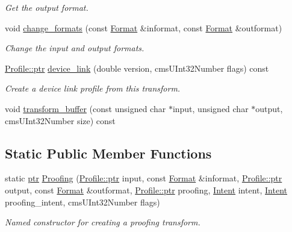 \begin{DoxyCompactItemize}
\begin{DoxyCompactList}\small\item\em Get the output format. \end{DoxyCompactList}\item 
void \hyperlink{class_c_m_s_1_1_transform_a1bb15efea35b385a09e84e5a38f87a3f}{change\+\_\+formats} (const \hyperlink{class_c_m_s_1_1_format}{Format} \&informat, const \hyperlink{class_c_m_s_1_1_format}{Format} \&outformat)
\begin{DoxyCompactList}\small\item\em Change the input and output formats. \end{DoxyCompactList}\item 
\hyperlink{class_c_m_s_1_1_profile_a7d5a80e1317d17dbfdf5ae69820ab08b}{Profile\+::ptr} \hyperlink{class_c_m_s_1_1_transform_ac8998c2530857d890e77ada564fec20a}{device\+\_\+link} (double version, cms\+U\+Int32\+Number flags) const
\begin{DoxyCompactList}\small\item\em Create a device link profile from this transform. \end{DoxyCompactList}\item 
void \hyperlink{class_c_m_s_1_1_transform_a8e86a3c86ac37b272bac946667abeb8d}{transform\+\_\+buffer} (const unsigned char $\ast$input, unsigned char $\ast$output, cms\+U\+Int32\+Number size) const
\end{DoxyCompactItemize}
\subsection*{Static Public Member Functions}
\begin{DoxyCompactItemize}
\item 
static \hyperlink{class_c_m_s_1_1_transform_ac0fcc21ddc52273f9ce95dba97ef1116}{ptr} \hyperlink{class_c_m_s_1_1_transform_ab67f92614a6ba25d1cc22c11d14f3c66}{Proofing} (\hyperlink{class_c_m_s_1_1_profile_a7d5a80e1317d17dbfdf5ae69820ab08b}{Profile\+::ptr} input, const \hyperlink{class_c_m_s_1_1_format}{Format} \&informat, \hyperlink{class_c_m_s_1_1_profile_a7d5a80e1317d17dbfdf5ae69820ab08b}{Profile\+::ptr} output, const \hyperlink{class_c_m_s_1_1_format}{Format} \&outformat, \hyperlink{class_c_m_s_1_1_profile_a7d5a80e1317d17dbfdf5ae69820ab08b}{Profile\+::ptr} proofing, \hyperlink{namespace_c_m_s_aabe6afbe3c2cd6188befc3096f1ea069}{Intent} intent, \hyperlink{namespace_c_m_s_aabe6afbe3c2cd6188befc3096f1ea069}{Intent} proofing\+\_\+intent, cms\+U\+Int32\+Number flags)
\begin{DoxyCompactList}\small\item\em Named constructor for creating a proofing transform. \end{DoxyCompactList}\end{DoxyCompactItemize}
